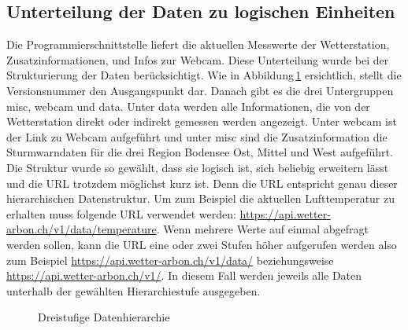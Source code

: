 \subsection{Unterteilung der Daten zu logischen Einheiten}
Die Programmierschnittstelle liefert die aktuellen Messwerte der Wetterstation, Zusatzinformationen, und Infos zur Webcam. Diese Unterteilung wurde bei der Strukturierung der Daten berücksichtigt.
Wie in Abbildung\,\ref{img:hierarchie} ersichtlich, stellt die Versionsnummer den Ausgangspunkt dar. Danach gibt es die drei Untergruppen misc, webcam und data. Unter data werden alle Informationen, die von der Wetterstation direkt oder indirekt gemessen werden angezeigt. Unter webcam ist der Link zu Webcam aufgeführt und unter misc sind die Zusatzinformation die Sturmwarndaten für die drei Region Bodensee Ost, Mittel und West aufgeführt. Die Struktur wurde so gewählt, dass sie logisch ist, sich beliebig erweitern lässt und die URL trotzdem möglichst kurz ist. Denn die URL entspricht genau dieser hierarchischen Datenstruktur. Um zum Beispiel die aktuellen Lufttemperatur zu erhalten muss folgende URL verwendet werden: \url{https://api.wetter-arbon.ch/v1/data/temperature}. Wenn mehrere Werte auf einmal abgefragt werden sollen, kann die URL eine oder zwei Stufen höher aufgerufen werden also zum Beispiel \url{https://api.wetter-arbon.ch/v1/data/} beziehungsweise \url{https://api.wetter-arbon.ch/v1/}. In diesem Fall werden jeweils alle Daten unterhalb der gewählten Hierarchiestufe ausgegeben.


\begin{figure}[htbp!]
	\centering
	\caption{Dreistufige Datenhierarchie}
	\label{img:hierarchie}
\end{figure}

